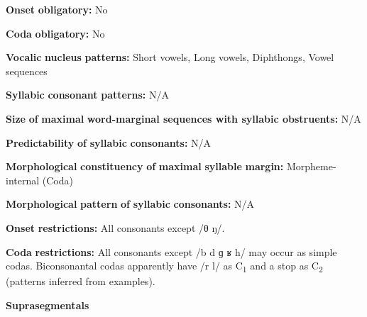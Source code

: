 \begin{styleBody}
\textbf{Onset} \textbf{obligatory:} No
\end{styleBody}

\begin{styleBody}
\textbf{Coda} \textbf{obligatory:} No
\end{styleBody}

\begin{styleBody}
\textbf{Vocalic} \textbf{nucleus} \textbf{patterns:} Short vowels, Long vowels, Diphthongs, Vowel sequences
\end{styleBody}

\begin{styleBody}
\textbf{Syllabic} \textbf{consonant} \textbf{patterns:} N/A
\end{styleBody}

\begin{styleBody}
\textbf{Size} \textbf{of} \textbf{maximal} \textbf{word{}-marginal sequences with syllabic obstruents:} N/A
\end{styleBody}

\begin{styleBody}
\textbf{Predictability} \textbf{of} \textbf{syllabic} \textbf{consonants:} N/A
\end{styleBody}

\begin{styleBody}
\textbf{Morphological} \textbf{constituency} \textbf{of} \textbf{maximal} \textbf{syllable} \textbf{margin:} Morpheme-internal (Coda)
\end{styleBody}

\begin{styleBody}
\textbf{Morphological} \textbf{pattern} \textbf{of} \textbf{syllabic} \textbf{consonants:} N/A
\end{styleBody}

\begin{styleBody}
\textbf{Onset} \textbf{restrictions:} All consonants except /θ ŋ/.
\end{styleBody}

\begin{styleBody}
\textbf{Coda} \textbf{restrictions:} All consonants except /b d ɡ ʁ h/ may occur as simple codas. Biconsonantal codas apparently have /r l/ as C\textsubscript{1} and a stop as C\textsubscript{2} (patterns inferred from examples).
\end{styleBody}

\begin{styleBody}
\textbf{Suprasegmentals}
\end{styleBody}

